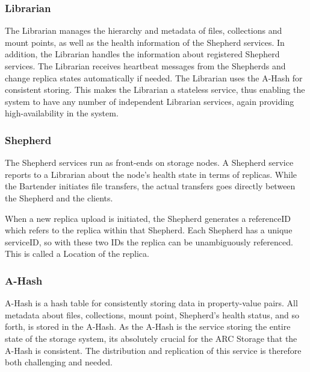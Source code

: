 \documentclass[final]{ieee}
\begin{document}
\subsubsection{Librarian}
\label{librarian}
The Librarian manages the hierarchy and metadata of
files, collections and mount points, as well as the health information of the Shepherd
services. In addition, the Librarian handles
the information about registered Shepherd services. The Librarian receives
heartbeat messages from the Shepherds and change replica states automatically
if needed. The Librarian uses the A-Hash for consistent storing. This makes the
Librarian a stateless service, thus enabling the system to have any
number of independent
Librarian services, again providing high-availability in the
system.

\subsubsection{Shepherd}
\label{Shepherd}

The Shepherd services run as front-ends on storage nodes. A Shepherd
service reports to a Librarian about the 
node's health state in terms of replicas. While the Bartender initiates
file transfers, the actual transfers goes directly between the Shepherd
and the clients.
 
When a new replica upload
is initiated, the Shepherd generates a referenceID which refers to
the replica within
that Shepherd. Each Shepherd has a unique serviceID, so with these two
IDs the replica can be unambiguously referenced. This is called a Location
of the replica. %



\subsubsection{A-Hash}
\label{Hash Algorithm}

A-Hash is a hash table for consistently storing data in property-value
pairs. All metadata about files, collections, mount point, Shepherd's
health status, and so forth, is stored in the A-Hash. As the A-Hash is
the service storing the entire state of the storage system, its
absolutely crucial for the ARC Storage that the A-Hash is
consistent. The distribution and replication of this service is
therefore both challenging and needed.
\end{document}
